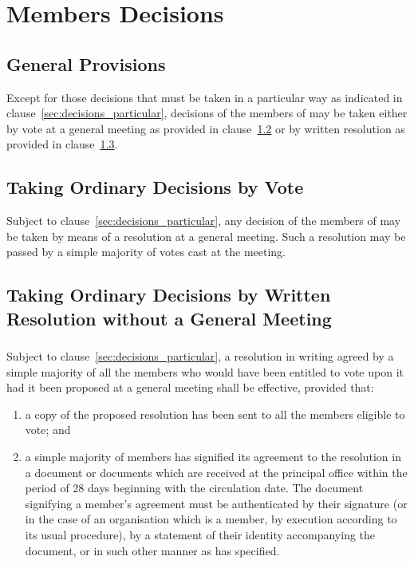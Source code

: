 \section{Members Decisions}\label{sec:member_decisions}

    \subsection{General Provisions}\label{sec:decisions_general}
    Except for those decisions that must be taken in a particular way as indicated in clause~\ref{sec:decisions_particular}, decisions of the members of \shortname{} may be taken either by vote at a general meeting as provided in clause~\ref{sec:decisions_vote} or by written resolution as provided in clause~\ref{sec:written_resolutions}.

    \subsection{Taking Ordinary Decisions by Vote}\label{sec:decisions_vote}
    Subject to clause~\ref{sec:decisions_particular}, any decision of the members of \shortname{} may be taken by means of a resolution at a general meeting. Such a resolution may be passed by a simple majority of votes cast at the meeting.

    \subsection{Taking Ordinary Decisions by Written Resolution without a General Meeting}\label{sec:written_resolutions}

        \subsubsection{}\label{sec:resolution_validity}
        Subject to clause~\ref{sec:decisions_particular}, a resolution in writing agreed by a simple majority of all the members who would have been entitled to vote upon it had it been proposed at a general meeting shall be effective, provided that:
        \begin{enumerate}
            \item a copy of the proposed resolution has been sent to all the members eligible to vote; and
            \item a simple majority of members has signified its agreement to the resolution in a document or documents which are received at the principal office within the period of 28 days beginning with the circulation date. The document signifying a member's agreement must be authenticated by their signature (or in the case of an organisation which is a member, by execution according to its usual procedure), by a statement of their identity accompanying the document, or in such other manner as \shortname{} has specified.
        \end{enumerate}

